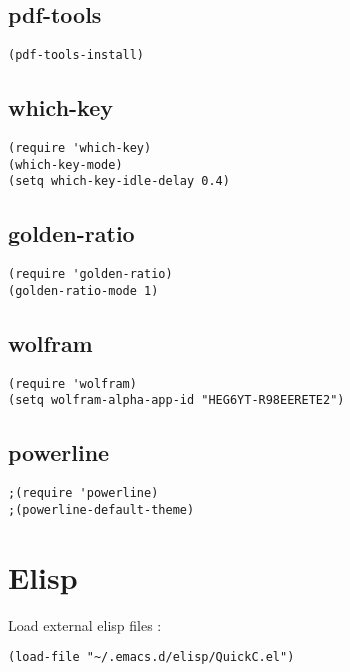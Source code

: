 \documentclass[11pt]{article}
\begin{document}
\subsection{pdf-tools}
\label{sec-2-26}
\begin{verbatim}
(pdf-tools-install)
\end{verbatim}
\subsection{which-key}
\label{sec-2-27}
\begin{verbatim}
(require 'which-key)
(which-key-mode)
(setq which-key-idle-delay 0.4)
\end{verbatim}
\subsection{golden-ratio}
\label{sec-2-28}
\begin{verbatim}
(require 'golden-ratio)
(golden-ratio-mode 1)
\end{verbatim}
\subsection{wolfram}
\label{sec-2-29}
\begin{verbatim}
(require 'wolfram)
(setq wolfram-alpha-app-id "HEG6YT-R98EERETE2")
\end{verbatim}
\subsection{powerline}
\label{sec-2-30}
\begin{verbatim}
;(require 'powerline)
;(powerline-default-theme)
\end{verbatim}
\section{Elisp}
\label{sec-3}
Load external elisp files :
\begin{verbatim}
(load-file "~/.emacs.d/elisp/QuickC.el")
\end{verbatim}
\end{document}
